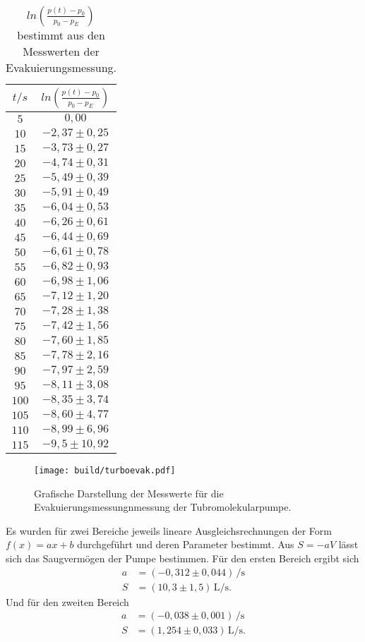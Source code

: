 \begin{table}
  \centering
  \caption{$ln(\frac{p(t)-p_0}{p_0 - p_E})$ bestimmt aus den Messwerten der Evakuierungsmessung.}
  \label{tab:ln}
  \begin{tabular}{c c}
    \toprule
    $t/s$ & $ln(\frac{p(t)-p_0}{p_0 - p_E})$ \\
    \midrule
    $  5$ & $ 0,00          $\\
    $ 10$ & $-2,37 \pm  0,25$\\
    $ 15$ & $-3,73 \pm  0,27$\\
    $ 20$ & $-4,74 \pm  0,31$\\
    $ 25$ & $-5,49 \pm  0,39$\\
    $ 30$ & $-5,91 \pm  0,49$\\
    $ 35$ & $-6,04 \pm  0,53$\\
    $ 40$ & $-6,26 \pm  0,61$\\
    $ 45$ & $-6,44 \pm  0,69$\\
    $ 50$ & $-6,61 \pm  0,78$\\
    $ 55$ & $-6,82 \pm  0,93$\\
    $ 60$ & $-6,98 \pm  1,06$\\
    $ 65$ & $-7,12 \pm  1,20$\\
    $ 70$ & $-7,28 \pm  1,38$\\
    $ 75$ & $-7,42 \pm  1,56$\\
    $ 80$ & $-7,60 \pm  1,85$\\
    $ 85$ & $-7,78 \pm  2,16$\\
    $ 90$ & $-7,97 \pm  2,59$\\
    $ 95$ & $-8,11 \pm  3,08$\\
    $100$ & $-8,35 \pm  3,74$\\
    $105$ & $-8,60 \pm  4,77$\\
    $110$ & $-8,99 \pm  6,96$\\
    $115$ & $-9,5  \pm 10,92$\\
    \bottomrule
  \end{tabular}
\end{table}

\begin{figure}[H]
  \centering
  \texttt{[image: build/turboevak.pdf]}
  \caption{Grafische Darstellung der Messwerte für die Evakuierungsmessungnmessung der Tubromolekularpumpe.}
  \label{fig:turboevak}
\end{figure}

Es wurden für zwei Bereiche jeweils lineare Ausgleichsrechnungen der Form $f(x)=ax+b$ durchgeführt und deren
Parameter bestimmt. Aus $S=-aV$ lässt sich das Saugvermögen der Pumpe bestimmen. Für den ersten Bereich ergibt
sich
\begin{align*}
  a &= (-0,312 \pm 0,044)\,\si{\per\second}\\
  S &= (10,3 \pm 1,5)\,\si{\liter\per\second}.
\end{align*}
Und für den zweiten Bereich
\begin{align*}
  a &= (-0,038 \pm 0,001)\,\si{\per\second}\\
  S &=(1,254 \pm 0,033)\,\si{\liter\per\second}.
\end{align*}

